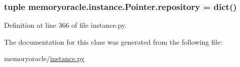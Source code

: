 \subsubsection[{repository}]{\setlength{\rightskip}{0pt plus 5cm}tuple memoryoracle.\+instance.\+Pointer.\+repository = dict()\hspace{0.3cm}{\ttfamily [static]}}\label{classmemoryoracle_1_1instance_1_1Pointer_ab386b41b9f0cf6ff19065f0ae00647b6}


Definition at line 366 of file instance.\+py.



The documentation for this class was generated from the following file\+:\begin{DoxyCompactItemize}
\item 
memoryoracle/\hyperlink{instance_8py}{instance.\+py}\end{DoxyCompactItemize}
